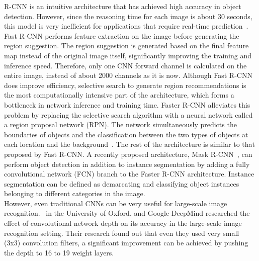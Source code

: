 R-CNN is an intuitive architecture that has achieved high accuracy in object detection. However, since the reasoning time for each image is about 30 seconds, this model is very inefficient for applications that require real-time prediction~\cite{huang2017speed}. Fast R-CNN performs feature extraction on the image before generating the region suggestion. The region suggestion is generated based on the final feature map instead of the original image itself, significantly improving the training and inference speed. Therefore, only one CNN forward channel is calculated on the entire image, instead of about 2000 channels as it is now. Although Fast R-CNN does improve efficiency, selective search to generate region recommendations is the most computationally intensive part of the architecture, which forms a bottleneck in network inference and training time. Faster R-CNN alleviates this problem by replacing the selective search algorithm with a neural network called a region proposal network (RPN). The network simultaneously predicts the boundaries of objects and the classification between the two types of objects at each location and the background~\cite{ren2015faster}. The rest of the architecture is similar to that proposed by Fast R-CNN.
A recently proposed architecture, Mask R-CNN~\cite{he2017mask}, can perform object detection in addition to instance segmentation by adding a fully convolutional network (FCN) branch to the Faster R-CNN architecture. Instance segmentation can be defined as demarcating and classifying object instances belonging to different categories in the image.\\

However, even traditional CNNs can be very useful for large-scale image recognition.~ in the University of Oxford, and Google DeepMind researched the effect of convolutional network depth on its accuracy in the large-scale image recognition setting. Their research found out that even they used very small (3x3) convolution filters, a significant improvement can be achieved by pushing the depth to 16 to 19 weight layers.\\


